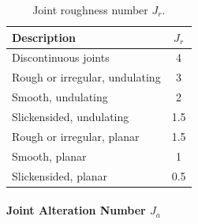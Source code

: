 \begin{table}[H]
\centering
\small
\begin{tabularx}{0.85\textwidth}{Y c}
\toprule
\textbf{Description} & \textbf{\(J_r\)} \\
\midrule
Discontinuous joints & 4 \\
Rough or irregular, undulating & 3 \\
Smooth, undulating & 2 \\
Slickensided, undulating & 1.5 \\
Rough or irregular, planar & 1.5 \\
Smooth, planar & 1 \\
Slickensided, planar & 0.5 \\
\bottomrule
\end{tabularx}
\caption{Joint roughness number \(J_r\).}
\label{tab:jr}
\end{table}

\paragraph{Joint Alteration Number \(J_a\)}

